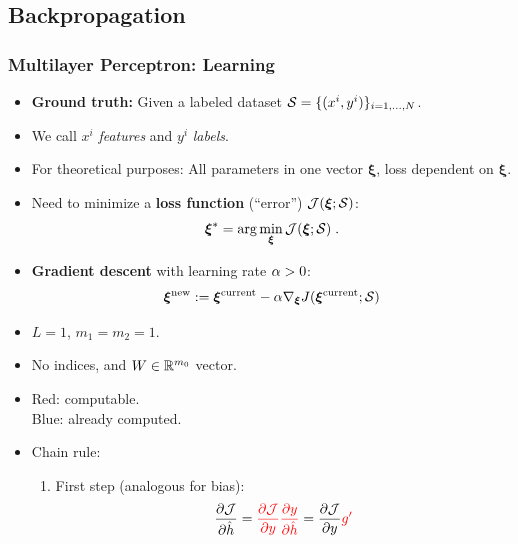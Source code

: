\documentclass[10pt,hyperref={pdfpagelabels=false}]{beamer}
\begin{document}
\subsection{Backpropagation}
\begin{frame}[allowframebreaks]
    \frametitle{Multilayer Perceptron: Learning}
    \begin{itemize}
        \item {\bf Ground truth:} Given a labeled dataset $\mathcal{S}=\{(x^i, y^i)\}_{i=1,\dots,N}$.
        \item We call $x^i$ \emph{features} and $y^i$ \emph{labels}.
        \item For theoretical purposes: All parameters in one vector $\boldsymbol{\xi}$, loss dependent on $\boldsymbol{\xi}$.
        \item Need to minimize a {\bf loss function} (``error'') $\mathcal{J}(\boldsymbol{\xi}; \mathcal{S})$:
        $$
        \boldsymbol{\xi}^\ast = \arg\min_{\boldsymbol{\xi}} \mathcal{J}(\boldsymbol{\xi}; \mathcal{S})
        \;.
        $$
        \item {\bf Gradient descent} with learning rate $\alpha>0$:
        $$
            \boldsymbol{\xi}^{\text{new}} := \boldsymbol{\xi}^{\text{current}}
            - \alpha \nabla_{\boldsymbol{\xi}}J(\boldsymbol{\xi}^{\text{current}};\mathcal{S})
        $$
    \end{itemize}
    \framebreak
    \centering
    \framebreak
    \begin{minipage}{.6\textwidth}
        {\small
        \begin{itemize}
            \item $L=1$, $m_1=m_{2}=1$.
            \item No indices, and $W\in\mathbb{R}^{m_0}$ vector.
            \item {\color{red}Red:} computable. \\
            {\color{blue}Blue:} already computed.
            \item Chain rule:
            \begin{enumerate}
                \item First step (analogous for bias):
                $$
                \frac{\partial\mathcal{J}}{\partial \hat{h}} =
                {\color{red}
                \frac{\partial\mathcal{J}}{\partial y} \frac{\partial y}{\partial \hat{h}}}
                =
                \frac{\partial\mathcal{J}}{\partial y} {\color{red}g'}
$$
\end{enumerate}
\end{itemize}}
\end{minipage}
\end{frame}
\end{document}
